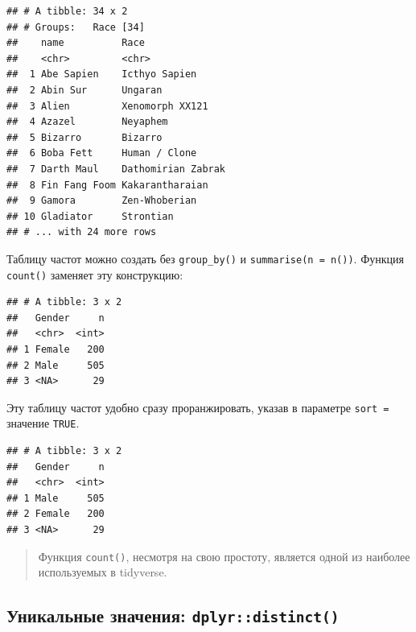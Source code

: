 \documentclass[
]{book}
\newenvironment{Shaded}{\begin{snugshade}}{\end{snugshade}}
\newcommand{\DataTypeTok}[1]{\textcolor[rgb]{0.13,0.29,0.53}{#1}}
\newcommand{\KeywordTok}[1]{\textcolor[rgb]{0.13,0.29,0.53}{\textbf{#1}}}
\newcommand{\NormalTok}[1]{#1}
\newcommand{\OperatorTok}[1]{\textcolor[rgb]{0.81,0.36,0.00}{\textbf{#1}}}
\newcommand{\OtherTok}[1]{\textcolor[rgb]{0.56,0.35,0.01}{#1}}
\newcommand{\StringTok}[1]{\textcolor[rgb]{0.31,0.60,0.02}{#1}}
\begin{document}
\begin{verbatim}
## # A tibble: 34 x 2
## # Groups:   Race [34]
##    name          Race              
##    <chr>         <chr>             
##  1 Abe Sapien    Icthyo Sapien     
##  2 Abin Sur      Ungaran           
##  3 Alien         Xenomorph XX121   
##  4 Azazel        Neyaphem          
##  5 Bizarro       Bizarro           
##  6 Boba Fett     Human / Clone     
##  7 Darth Maul    Dathomirian Zabrak
##  8 Fin Fang Foom Kakarantharaian   
##  9 Gamora        Zen-Whoberian     
## 10 Gladiator     Strontian         
## # ... with 24 more rows
\end{verbatim}

Таблицу частот можно создать без \texttt{group\_by()} и \texttt{summarise(n\ =\ n())}. Функция \texttt{count()} заменяет эту конструкцию:

\begin{Shaded}
\end{Shaded}

\begin{verbatim}
## # A tibble: 3 x 2
##   Gender     n
##   <chr>  <int>
## 1 Female   200
## 2 Male     505
## 3 <NA>      29
\end{verbatim}

Эту таблицу частот удобно сразу проранжировать, указав в параметре \texttt{sort\ =} значение \texttt{TRUE}.

\begin{Shaded}
\end{Shaded}

\begin{verbatim}
## # A tibble: 3 x 2
##   Gender     n
##   <chr>  <int>
## 1 Male     505
## 2 Female   200
## 3 <NA>      29
\end{verbatim}

\begin{quote}
Функция \texttt{count()}, несмотря на свою простоту, является одной из наиболее используемых в tidyverse.
\end{quote}

\hypertarget{tidy_distinct}{%
\subsection{\texorpdfstring{Уникальные значения: \texttt{dplyr::distinct()}}{Уникальные значения: dplyr::distinct()}}\label{tidy_distinct}}
\end{document}
